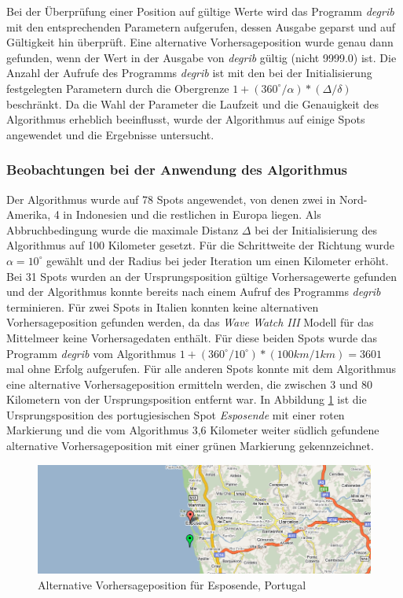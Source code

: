 Bei der Überprüfung einer Position auf gültige Werte wird das Programm
\textit{degrib} mit den entsprechenden Parametern aufgerufen, dessen
Ausgabe geparst und auf Gültigkeit hin überprüft. Eine alternative
Vorhersageposition wurde genau dann gefunden, wenn der Wert in der
Ausgabe von \textit{degrib} gültig (nicht 9999.0) ist. Die Anzahl der
Aufrufe des Programms \textit{degrib} ist mit den bei der
Initialisierung festgelegten Parametern durch die Obergrenze $1 +
(360^{\circ} / \alpha) * (\Delta / \delta)$ beschränkt. Da die Wahl
der Parameter die Laufzeit und die Genauigkeit des Algorithmus
erheblich beeinflusst, wurde der Algorithmus auf einige Spots
angewendet und die Ergebnisse untersucht.

\subsubsection{Beobachtungen bei der Anwendung des Algorithmus}
Der Algorithmus wurde auf 78 Spots angewendet, von denen zwei in
Nord-Amerika, 4 in Indonesien und die restlichen in Europa liegen. Als
Abbruchbedingung wurde die maximale Distanz $\Delta$ bei der
Initialisierung des Algorithmus auf 100 Kilometer gesetzt. Für die
Schrittweite der Richtung wurde $\alpha = 10^{\circ}$ gewählt und der
Radius bei jeder Iteration um einen Kilometer erhöht. Bei 31 Spots
wurden an der Ursprungsposition gültige Vorhersagewerte gefunden und
der Algorithmus konnte bereits nach einem Aufruf des Programms
\textit{degrib} terminieren. Für zwei Spots in Italien konnten keine
alternativen Vorhersageposition gefunden werden, da das \textit{Wave
  Watch III} Modell für das Mittelmeer keine Vorhersagedaten
enthält. Für diese beiden Spots wurde das Programm \textit{degrib} vom
Algorithmus $1 + (360^{\circ} / 10^{\circ}) * (100km / 1km) = 3601$
mal ohne Erfolg aufgerufen. Für alle anderen Spots konnte mit dem
Algorithmus eine alternative Vorhersageposition ermitteln werden, die
zwischen 3 und 80 Kilometern von der Ursprungsposition entfernt
war. In Abbildung \ref{locate-esposende} ist die Ursprungsposition des
portugiesischen Spot \textit{Esposende} mit einer roten Markierung und
die vom Algorithmus 3,6 Kilometer weiter südlich gefundene alternative
Vorhersageposition mit einer grünen Markierung gekennzeichnet.

\begin{figure}[h]
  \begin{center}
    \includegraphics[width=\textwidth]{bilder/locate-esposende}
    \caption{Alternative Vorhersageposition für Esposende, Portugal}
    \label{locate-esposende}
  \end{center}
\end{figure}

